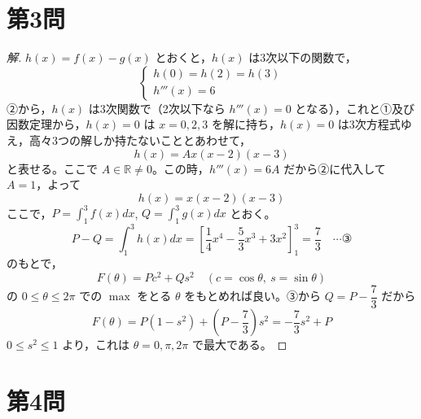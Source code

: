 \documentclass[../main.tex]{subfiles}
\begin{document}
\newpage

\section*{第3問}

\begin{proof}[解]
  $h(x) = f(x) - g(x)$ とおくと，$h(x)$ は3次以下の関数で，
  \[
    \begin{cases}
      h(0)=h(2)=h(3) \\
      h'''(x) = 6
    \end{cases}
  \]
  ②から，$h(x)$ は3次関数で（2次以下なら $h'''(x)=0$ となる），これと①及び因数定理から，$h(x)=0$ は $x=0,2,3$ を解に持ち，$h(x)=0$ は3次方程式ゆえ，高々3つの解しか持たないこととあわせて，
  \[
    h(x) = Ax(x-2)(x-3)
  \]
  と表せる。ここで $A\in\mathbb{R}\neq0$。この時，$h'''(x)=6A$ だから②に代入して $A=1$，よって
  \[
    h(x) = x(x-2)(x-3)
  \]
  ここで，$P=\displaystyle\int_1^3 f(x)dx$, $Q=\displaystyle\int_1^3 g(x)dx$ とおく。
  \[
    P-Q = \int_1^3 h(x)dx = \left[\frac{1}{4}x^4-\frac{5}{3}x^3+3x^2\right]_1^3 = \frac{7}{3} \quad \cdots \text{③}
  \]
  のもとで，
  \[
    F(\theta) = Pc^2+Qs^2 \quad (c=\cos\theta,\ s=\sin\theta)
  \]
  の $0\le\theta\le2\pi$ での $\max$ をとる $\theta$ をもとめれば良い。③から $Q=P-\dfrac{7}{3}$ だから
  \[
    F(\theta) = P(1-s^2)+\left(P-\frac{7}{3}\right)s^2 = -\frac{7}{3}s^2+P
  \]
  $0\le s^2\le1$ より，これは $\theta=0,\pi,2\pi$ で最大である。
\end{proof}

\newpage

\section*{第4問}
\end{document}
